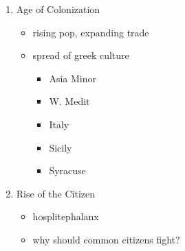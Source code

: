 \documentclass[11pt, a4paper]{article}
\begin{document}
\begin{itemize}
\begin{enumerate}
\begin{itemize}
        \end{itemize}
      \item Age of Colonization
        \begin{itemize}
          \item rising pop, expanding trade
          \item spread of greek culture
            \begin{itemize}
              \item Asia Minor
              \item W. Medit
              \item Italy
              \item Sicily
              \item Syracuse
            \end{itemize}
          \end{itemize}
        \item Rise of the Citizen
          \begin{itemize}
            \item hosplitephalanx
            \item why should common citizens fight?
          \end{itemize}
    \end{enumerate}
\end{itemize}
\end{document}
